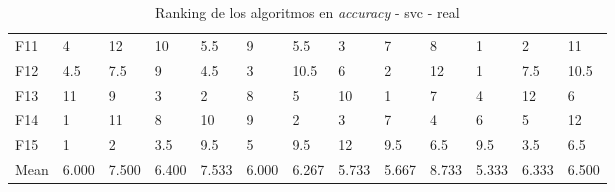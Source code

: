 \begin{table}
\begin{adjustbox}{width=\linewidth}
\begin{tabular}{lllllllllllll}
            F11  & 4     & 12    & 10    & 5.5   & 9     & 5.5   & 3     & 7     & 8     & 1     & 2     & 11    \\
            F12  & 4.5   & 7.5   & 9     & 4.5   & 3     & 10.5  & 6     & 2     & 12    & 1     & 7.5   & 10.5  \\
            F13  & 11    & 9     & 3     & 2     & 8     & 5     & 10    & 1     & 7     & 4     & 12    & 6     \\
            F14  & 1     & 11    & 8     & 10    & 9     & 2     & 3     & 7     & 4     & 6     & 5     & 12    \\
            F15  & 1     & 2     & 3.5   & 9.5   & 5     & 9.5   & 12    & 9.5   & 6.5   & 9.5   & 3.5   & 6.5   \\
            Mean & 6.000 & 7.500 & 6.400 & 7.533 & 6.000 & 6.267 & 5.733 & 5.667 & 8.733 & 5.333 & 6.333 & 6.500 \\
            \bottomrule
        \end{tabular}
    \end{adjustbox}
    \caption{Ranking de los algoritmos en \textit{accuracy} - svc - real}
    \label{tab:ranking_accuracy_real_svc}
\end{table}


